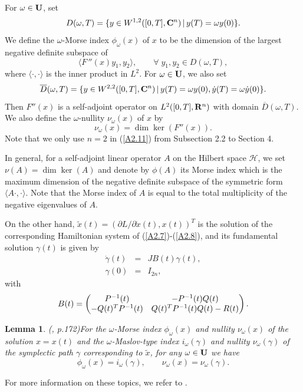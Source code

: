 \documentclass[11pt]{article}
\newtheorem{lemma}{Lemma}[section]
\def\be{\begin{equation}}
\def\ee{\end{equation}}
\def\bea{\begin{eqnarray}}
\def\eea{\end{eqnarray}}
\def\lb{\label}
\def\R{{\bf R}}
\def\C{{\bf C}}
\def\U{{\bf U}}
\def\ga{{\gamma}}
\def\om{{\omega}}
\def\ol#1{\overline{#1}}
\def\td#1{\tilde{#1}}
\begin{document}
For $\omega\in\U$, set
\be  D(\omega,T)=\{y\in W^{1,2}([0,T],\C^n)\,|\, y(T)=\omega y(0) \}.   \lb{A2.10}\ee
We define the $\omega$-Morse index $\phi_\omega(x)$ of $x$ to be the dimension of the
largest negative definite subspace of
$$ \langle F\,''(x)y_1,y_2 \rangle, \qquad \forall\;y_1,y_2\in D(\omega,T), $$
where $\langle\cdot,\cdot\rangle$ is the inner product in $L^2$. For $\omega\in\U$, we
also set
\be  \ol{D}(\omega,T)= \{y\in W^{2,2}([0,T],\C^n)\,|\, y(T)=\omega y(0), \dot{y}(T)=\om\dot{y}(0) \}.
                     \lb{A2.11}\ee
Then $F''(x)$ is a self-adjoint operator on $L^2([0,T],\R^n)$ with domain $\ol{D}(\omega,T)$.
We also define the $\om$-nullity $\nu_{\om}(x)$ of $x$ by
$$ \nu_{\om}(x)=\dim\ker(F''(x)).  $$
Note that we only use $n=2$ in (\ref{A2.11}) from Subsection 2.2 to Section 4.

In general, for a self-adjoint linear operator $A$ on the Hilbert space $\mathscr{H}$, we set
$\nu(A)=\dim\ker(A)$ and denote by $\phi(A)$ its Morse index which is the maximum dimension
of the negative definite subspace of the symmetric form $\langle A\cdot,\cdot\rangle$. Note
that the Morse index of $A$  is equal to the total multiplicity of the negative eigenvalues
of $A$.

On the other hand, $\td{x}(t)=(\partial L/\partial\dot{x}(t),x(t))^T$ is the solution of the
corresponding Hamiltonian system of (\ref{A2.7})-(\ref{A2.8}), and its fundamental solution
$\gamma(t)$ is given by
\bea \dot{\gamma}(t) &=& JB(t)\gamma(t),  \lb{A2.12}\\
     \gamma(0) &=& I_{2n},  \lb{A2.13}\eea
with
\be B(t)=\left(\begin{matrix}P^{-1}(t)& -P^{-1}(t)Q(t)\cr
                       -Q(t)^TP^{-1}(t)& Q(t)^TP^{-1}(t)Q(t)-R(t)\end{matrix}\right). \lb{A2.14}\ee

\begin{lemma} (\cite{Lon4}, p.172)\lb{Lm:A.12}  %
For the $\omega$-Morse index $\phi_\omega(x)$ and nullity $\nu_\omega(x)$ of the solution $x=x(t)$
and the $\omega$-Maslov-type index $i_\omega(\gamma)$ and nullity $\nu_\omega(\gamma)$ of the
symplectic path $\ga$ corresponding to $\td{x}$, for any $\omega\in\U$ we have
\be \phi_\omega(x) = i_\omega(\gamma), \qquad \nu_\omega(x) = \nu_\omega(\gamma).  \lb{A2.15}\ee
\end{lemma}

For more information on these topics, we refer to \cite{Lon4}.
 
\end{document}
